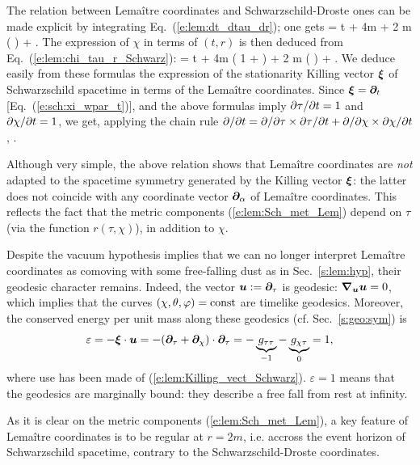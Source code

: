 The relation between Lemaître coordinates and
Schwarzschild-Droste ones can be made explicit by integrating
Eq.~(\ref{e:lem:dt_dtau_dr}); one gets
\be
    \tau = t + 4m  + 2 m \ln \left(
         \right) + .
\ee
The expression of $\chi$ in terms of $(t,r)$ is then deduced from
Eq.~(\ref{e:lem:chi_tau_r_Schwarz}):
\be
    \chi = t + 4m  \left( 1 +  \right)
        + 2 m \ln \left(
         \right)  + .
\ee
We deduce easily from these formulas the expression of the stationarity
Killing vector $\bm{\xi}$ of Schwarzschild spacetime in terms of the
Lemaître coordinates. Since $\bm{\xi} = \bm{\partial}_t$ [Eq.~(\ref{e:sch:xi_wpar_t})],
and the above formulas
imply ${\partial \tau}/{\partial t} =1$ and ${\partial \chi}/{\partial t}=1$, we get, applying
the chain rule ${\partial }/{\partial t} = {\partial }/{\partial \tau} \times {\partial \tau}/{\partial t} + {\partial }/{\partial \chi} \times {\partial \chi}/{\partial t}$,
\be \label{e:lem:Killing_vect_Schwarz}
    \encadre{\w{\xi} = \wpar_\tau + \wpar_\chi }.
\ee
\begin{remark}
Although very simple, the above relation shows that Lemaître coordinates are \emph{not}
adapted to the spacetime symmetry generated by the Killing vector $\bm{\xi}$:
the latter does not coincide with any coordinate vector $\bm{\partial}_\alpha$ of
Lemaître coordinates. This reflects
the fact that the metric components (\ref{e:lem:Sch_met_Lem}) depend on $\tau$
(via the function $r(\tau,\chi)$), in addition to $\chi$.
\end{remark}

Despite the vacuum hypothesis implies that we can no longer interpret
Lemaître coordinates as comoving with some free-falling dust as in Sec.~\ref{s:lem:hyp},
their geodesic character remains. Indeed, the vector $\bm{u} := \bm{\partial}_\tau$ is geodesic:
$\bm{\nabla}_{\bm{u}}\bm{u} = 0$, which implies that the curves $(\chi,\theta,\varphi)=\mathrm{const}$
are timelike geodesics. Moreover, the conserved energy per unit mass along these geodesics
(cf. Sec.~\ref{s:geo:sym}) is
\[
     \varepsilon = - \bm{\xi}\cdot\bm{u} = - (\bm{\partial}_\tau + \bm{\partial}_\chi)\cdot \bm{\partial}_\tau
        = - \underbrace{g_{\tau\tau}}_{-1} - \underbrace{g_{\chi\tau}}_{0} = 1 ,
\]
where use has been made of (\ref{e:lem:Killing_vect_Schwarz}).
$\varepsilon=1$ means
that the geodesics are marginally bound: they
describe a free fall from rest at infinity.

As it is clear on the metric components (\ref{e:lem:Sch_met_Lem}),
a key feature of Lemaître coordinates is to be regular at $r=2m$, i.e.
accross the event horizon of Schwarzschild spacetime, contrary to the
Schwarzschild-Droste coordinates.

